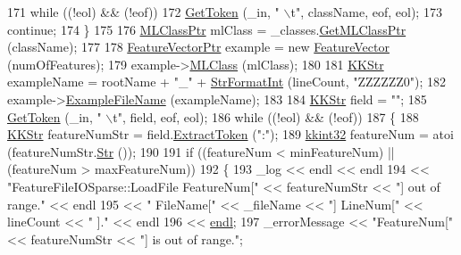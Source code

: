 \begin{DoxyCode}
171       \textcolor{keywordflow}{while}  ((!eol)  &&  (!eof))
172         \hyperlink{class_k_k_m_l_l_1_1_feature_file_i_o_ae79ac82b32e63fa7e7d96c833b5631f2}{GetToken} (\_in, \textcolor{stringliteral}{" \(\backslash\)t"}, className, eof, eol);
173       \textcolor{keywordflow}{continue};
174     \}
175 
176     \hyperlink{class_k_k_m_l_l_1_1_m_l_class}{MLClassPtr} mlClass = \_classes.\hyperlink{class_k_k_m_l_l_1_1_m_l_class_list_ab751a744d6e0d8937ca64b9cdde1488b}{GetMLClassPtr} (className);
177 
178     \hyperlink{class_k_k_m_l_l_1_1_feature_vector}{FeatureVectorPtr}  example = \textcolor{keyword}{new} \hyperlink{class_k_k_m_l_l_1_1_feature_vector}{FeatureVector} (numOfFeatures);
179     example->\hyperlink{class_k_k_m_l_l_1_1_feature_vector_a3c8fe002c6e868f8c00059c004fb32fd}{MLClass} (mlClass);
180 
181     \hyperlink{class_k_k_b_1_1_k_k_str}{KKStr}  exampleName = rootName + \textcolor{stringliteral}{"\_"} + \hyperlink{namespace_k_k_b_ae3bde258fa036604fac8bdb0277ab46e}{StrFormatInt} (lineCount, \textcolor{stringliteral}{"ZZZZZZ0"});
182     example->\hyperlink{class_k_k_m_l_l_1_1_feature_vector_ab47c89ab1e9396664fdc0dc34b6e1ab5}{ExampleFileName} (exampleName);
183 
184     \hyperlink{class_k_k_b_1_1_k_k_str}{KKStr}  field = \textcolor{stringliteral}{""};
185     \hyperlink{class_k_k_m_l_l_1_1_feature_file_i_o_ae79ac82b32e63fa7e7d96c833b5631f2}{GetToken} (\_in, \textcolor{stringliteral}{" \(\backslash\)t"}, field, eof, eol);
186     \textcolor{keywordflow}{while}  ((!eol)  &&  (!eof))  
187     \{
188       \hyperlink{class_k_k_b_1_1_k_k_str}{KKStr}  featureNumStr = field.\hyperlink{class_k_k_b_1_1_k_k_str_acc31c95308d6d699debde883c11e5802}{ExtractToken} (\textcolor{stringliteral}{":"});
189       \hyperlink{namespace_k_k_b_a8fa4952cc84fda1de4bec1fbdd8d5b1b}{kkint32} featureNum = atoi (featureNumStr.\hyperlink{class_k_k_b_1_1_k_k_str_ad574e6c0fe7f6ce1ba3ab0a8ce2fbd52}{Str} ());
190       
191       \textcolor{keywordflow}{if}  ((featureNum < minFeatureNum)  ||  (featureNum > maxFeatureNum))
192       \{
193         \_log << endl << endl
194              << \textcolor{stringliteral}{"FeatureFileIOSparse::LoadFile  FeatureNum["} <<  featureNumStr << \textcolor{stringliteral}{"] out of range."} << endl
195              << \textcolor{stringliteral}{"                               FileName["}  << \_fileName << \textcolor{stringliteral}{"]  LineNum["} << lineCount << \textcolor{stringliteral}{"
      ]."}  << endl
196              << \hyperlink{namespace_k_k_b_ad1f50f65af6adc8fa9e6f62d007818a8}{endl};
197         \_errorMessage << \textcolor{stringliteral}{"FeatureNum["} << featureNumStr << \textcolor{stringliteral}{"]  is out of range."};

\end{DoxyCode}
